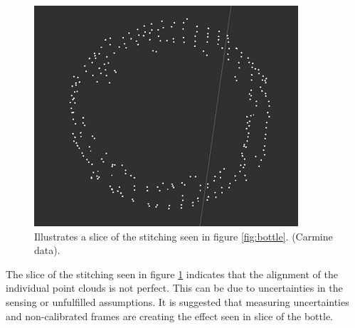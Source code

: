 \begin{figure}[htb]
	\begin{center}
		\includegraphics[scale=0.7,trim=0 0 0 0]{graphics/07_modelling/slice.png}%
		\caption{Illustrates a slice of the stitching seen in figure \ref{fig:bottle}. (Carmine data).}
		\label{fig:bottle_slice}
	\end{center}
\end{figure}

\noindent The slice of the stitching seen in figure \ref{fig:bottle_slice} indicates that the alignment of the individual point clouds is not perfect. This can be due to uncertainties in the sensing or unfulfilled assumptions. It is suggested that measuring uncertainties and non-calibrated frames are creating the effect seen in slice of the bottle.\\